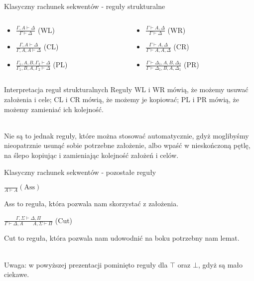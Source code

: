 \documentclass{beamer}
\begin{document}
\begin{frame}{Klasyczny rachunek sekwentów - reguły strukturalne}
\begin{columns}
\begin{column}{0.6\textwidth}
\begin{itemize}
	\setlength\itemsep{2em}
	\item $\displaystyle \frac{\Gamma, A \vdash \Delta}{\Gamma \vdash \Delta}$ (WL)
	\item $\displaystyle \frac{\Gamma, A \vdash \Delta}{\Gamma, A, A \vdash \Delta}$ (CL)
	\item $\displaystyle \frac{\Gamma_1, A, B, \Gamma_2 \vdash \Delta}{\Gamma_1, B, A, \Gamma_2 \vdash \Delta}$ (PL)
\end{itemize}
\end{column}
\begin{column}{0.5\textwidth}
\begin{itemize}
	\setlength\itemsep{2em}
	\item $\displaystyle \frac{\Gamma \vdash A, \Delta}{\Gamma \vdash \Delta}$ (WR)
	\item $\displaystyle \frac{\Gamma \vdash A, \Delta}{\Gamma \vdash A, A,\Delta}$ (CR)
	\item $\displaystyle \frac{\Gamma \vdash \Delta_1, A, B, \Delta_2}{\Gamma \vdash \Delta_1, B, A, \Delta_1}$ (PR)
\end{itemize}
\end{column}
\end{columns}
\end{frame}

\begin{frame}{Interpretacja reguł strukturalnych}
	Reguły WL i WR mówią, że możemy usuwać założenia i cele; CL i CR mówią, że możemy je kopiować; PL i PR mówią, że możemy zamieniać ich kolejność. \\~\
	
	Nie są to jednak reguły, które można stosować automatycznie, gdyż moglibyśmy nieopatrznie usunąć sobie potrzebne założenie, albo wpaść w nieskończoną pętlę, na ślepo kopiując i zamieniając kolejność założeń i celów.
\end{frame}

\begin{frame}{Klasyczny rachunek sekwentów - pozostałe reguły}
	\begin{center}
		$\displaystyle \frac{}{A \vdash A} (\text{Ass})$
	\end{center}
	
	Ass to reguła, która pozwala nam skorzystać z założenia.
	
	\begin{center}
		$\displaystyle \frac{\Gamma, \Sigma \vdash \Delta, \Pi}{\Gamma \vdash \Delta, A \qquad A, \Sigma \vdash \Pi}$ (Cut)
	\end{center}
	
	Cut to reguła, która pozwala nam udowodnić na boku potrzebny nam lemat. \\~\
	
	Uwaga: w powyższej prezentacji pominięto reguły dla $\top$ oraz $\bot$, gdyż są mało ciekawe.
\end{frame}
\end{document}
